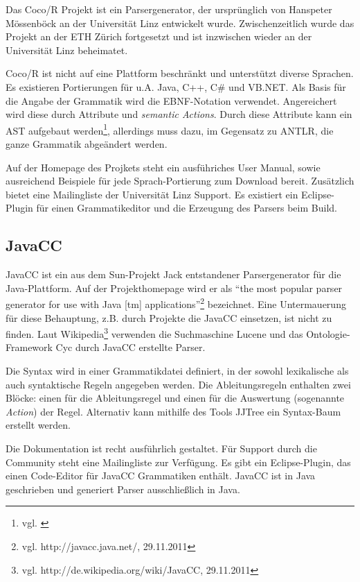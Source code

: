 Das Coco/R Projekt\cite{HaMo90} ist ein Parsergenerator, der ursprünglich von Hans\-peter Mössenböck an der Universität Linz entwickelt wurde. Zwischenzeitlich wurde das Projekt an der ETH Zürich fortgesetzt und ist inzwischen wieder an der Universität Linz beheimatet.

Coco/R ist nicht auf eine Plattform beschränkt und unterstützt diverse Spra\-chen. Es existieren Portierungen für u.A. Java, C++, C\# und VB.NET. Als Basis für die Angabe der Grammatik wird die EBNF-Notation verwendet. Angereichert wird diese durch Attribute und \emph{semantic Actions}. Durch diese Attribute kann ein AST aufgebaut werden\footnote{vgl. \cite{Moes11}}, allerdings muss dazu, im Gegensatz zu ANTLR, die ganze Grammatik abgeändert werden.

Auf der Homepage des Projkets steht ein ausführiches User Manual, sowie ausreichend Beispiele für jede Sprach-Portierung zum Download bereit. Zu\-sätz\-lich bietet eine Mailingliste der Universität Linz Support. Es existiert ein Eclipse-Plugin für einen Grammatikeditor und die Erzeugung des Parsers beim Build.

\subsection{JavaCC}


JavaCC ist ein aus dem Sun-Projekt Jack entstandener Parsergenerator für die Java-Plattform. Auf der Projekthomepage wird er als ``the most popular parser generator for use with Java [tm] applications''\footnote{vgl. http://javacc.java.net/, 29.11.2011} bezeichnet. Eine Untermauerung für diese Behauptung, z.B. durch Projekte die JavaCC einsetzen, ist nicht zu finden. Laut Wikipedia\footnote{vgl. http://de.wikipedia.org/wiki/JavaCC, 29.11.2011} verwenden die Suchmaschine Lucene und das Ontologie-Framework Cyc durch JavaCC erstellte Parser.

Die Syntax wird in einer Grammatikdatei definiert, in der sowohl lexikalische als auch syntaktische Regeln angegeben werden. Die Ab\-lei\-tungs\-re\-geln enthalten zwei Blöcke: einen für die Ab\-lei\-tungs\-re\-gel und einen für die Auswertung (sogenannte \emph{Action}) der Regel. Alternativ kann mithilfe des Tools JJTree ein Syntax-Baum erstellt werden.

Die Dokumentation ist recht ausführlich gestaltet. Für Support durch die Community steht eine Mailingliste zur Verfügung. Es gibt ein Eclipse-Plugin, das einen Code-Editor für JavaCC Grammatiken enthält. JavaCC ist in Java geschrieben und generiert Parser ausschließlich in Java.





